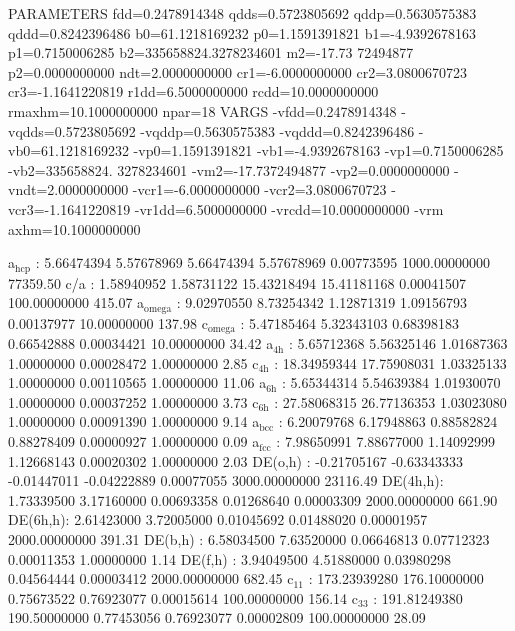 \documentclass[11pt]{article}
\begin{document}
PARAMETERS
  fdd=0.2478914348 qdds=0.5723805692 qddp=0.5630575383 qddd=0.8242396486 b0=61.1218169232 p0=1.1591391821 b1=-4.9392678163 p1=0.7150006285 b2=335658824.3278234601 m2=-17.73
72494877 p2=0.0000000000 ndt=2.0000000000 cr1=-6.0000000000 cr2=3.0800670723 cr3=-1.1641220819 r1dd=6.5000000000 rcdd=10.0000000000 rmaxhm=10.1000000000 npar=18 
VARGS
    -vfdd=0.2478914348 -vqdds=0.5723805692 -vqddp=0.5630575383 -vqddd=0.8242396486 -vb0=61.1218169232 -vp0=1.1591391821 -vb1=-4.9392678163 -vp1=0.7150006285 -vb2=335658824.
3278234601 -vm2=-17.7372494877 -vp2=0.0000000000 -vndt=2.0000000000 -vcr1=-6.0000000000 -vcr2=3.0800670723 -vcr3=-1.1641220819 -vr1dd=6.5000000000 -vrcdd=10.0000000000 -vrm
axhm=10.1000000000 


a\(_{\text{hcp}}\)   :   5.66474394   5.57678969   5.66474394   5.57678969   0.00773595 1000.00000000     77359.50
c/a     :   1.58940952   1.58731122  15.43218494  15.41181168   0.00041507 100.00000000       415.07
a\(_{\text{omega}}\) :   9.02970550   8.73254342   1.12871319   1.09156793   0.00137977  10.00000000       137.98
c\(_{\text{omega}}\) :   5.47185464   5.32343103   0.68398183   0.66542888   0.00034421  10.00000000        34.42
a\(_{\text{4h}}\)    :   5.65712368   5.56325146   1.01687363   1.00000000   0.00028472   1.00000000         2.85
c\(_{\text{4h}}\)    :  18.34959344  17.75908031   1.03325133   1.00000000   0.00110565   1.00000000        11.06
a\(_{\text{6h}}\)    :   5.65344314   5.54639384   1.01930070   1.00000000   0.00037252   1.00000000         3.73
c\(_{\text{6h}}\)    :  27.58068315  26.77136353   1.03023080   1.00000000   0.00091390   1.00000000         9.14
a\(_{\text{bcc}}\)   :   6.20079768   6.17948863   0.88582824   0.88278409   0.00000927   1.00000000         0.09
a\(_{\text{fcc}}\)   :   7.98650991   7.88677000   1.14092999   1.12668143   0.00020302   1.00000000         2.03
DE(o,h) :  -0.21705167  -0.63343333  -0.01447011  -0.04222889   0.00077055 3000.00000000     23116.49
DE(4h,h):   1.73339500   3.17160000   0.00693358   0.01268640   0.00003309 2000.00000000       661.90
DE(6h,h):   2.61423000   3.72005000   0.01045692   0.01488020   0.00001957 2000.00000000       391.31
DE(b,h) :   6.58034500   7.63520000   0.06646813   0.07712323   0.00011353   1.00000000         1.14
DE(f,h) :   3.94049500   4.51880000   0.03980298   0.04564444   0.00003412 2000.00000000       682.45
c\(_{\text{11}}\)    : 173.23939280 176.10000000   0.75673522   0.76923077   0.00015614 100.00000000       156.14
c\(_{\text{33}}\)    : 191.81249380 190.50000000   0.77453056   0.76923077   0.00002809 100.00000000        28.09
\end{document}
